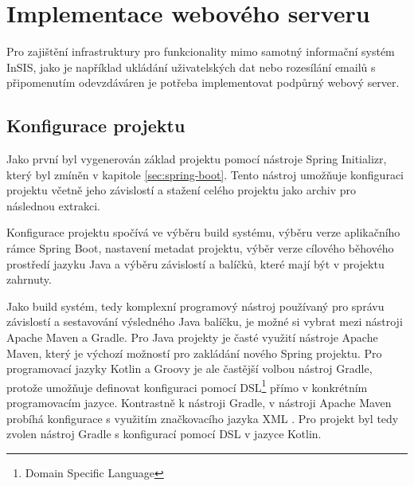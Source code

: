 \chapter{Implementace webového serveru}

Pro zajištění infrastruktury pro funkcionality mimo samotný informační systém InSIS, jako je například ukládání uživatelských dat nebo rozesílání emailů s připomenutím odevzdáváren je potřeba implementovat podpůrný webový server. 

\section{Konfigurace projektu}

Jako první byl vygenerován základ projektu pomocí nástroje Spring Initializr, který byl zmíněn v kapitole \ref{sec:spring-boot}. Tento nástroj umožňuje konfiguraci projektu včetně jeho závislostí a stažení celého projektu jako archiv pro následnou extrakci.

Konfigurace projektu spočívá ve výběru build systému, výběru verze aplikačního rámce Spring Boot, nastavení metadat projektu, výběr verze cílového běhového prostředí jazyku Java a výběru závislostí a balíčků, které mají být v projektu zahrnuty.

Jako build systém, tedy komplexní programový nástroj používaný pro správu závislostí a sestavování výsledného Java balíčku, je možné si vybrat mezi nástroji Apache Maven a Gradle. Pro Java projekty je časté využití nástroje Apache Maven, který je výchozí možností pro zakládání nového Spring projektu. Pro programovací jazyky Kotlin a Groovy je ale častější volbou nástroj Gradle, protože umožňuje definovat konfiguraci pomocí DSL\footnote{Domain Specific Language} přímo v konkrétním programovacím jazyce. Kontrastně k nástroji Gradle, v nástroji Apache Maven probíhá konfigurace s využitím značkovacího jazyka XML \cite{pom_reference}. Pro projekt byl tedy zvolen nástroj Gradle s konfigurací pomocí DSL v jazyce Kotlin.

